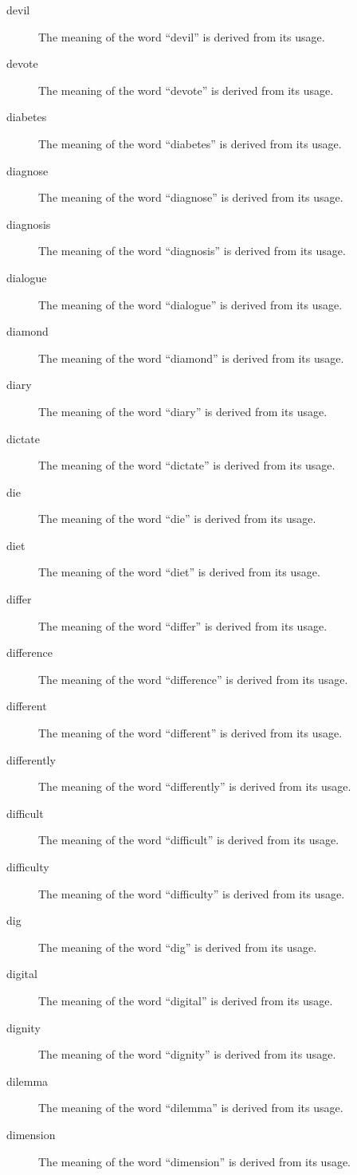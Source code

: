 \documentclass[12pt, letterpaper]{memoir}
\begin{document}
\begin{description}
\item[devil] The meaning of the word ``devil'' is derived from its usage.
\item[devote] The meaning of the word ``devote'' is derived from its usage.
\item[diabetes] The meaning of the word ``diabetes'' is derived from its usage.
\item[diagnose] The meaning of the word ``diagnose'' is derived from its usage.
\item[diagnosis] The meaning of the word ``diagnosis'' is derived from its usage.
\item[dialogue] The meaning of the word ``dialogue'' is derived from its usage.
\item[diamond] The meaning of the word ``diamond'' is derived from its usage.
\item[diary] The meaning of the word ``diary'' is derived from its usage.
\item[dictate] The meaning of the word ``dictate'' is derived from its usage.
\item[die] The meaning of the word ``die'' is derived from its usage.
\item[diet] The meaning of the word ``diet'' is derived from its usage.
\item[differ] The meaning of the word ``differ'' is derived from its usage.
\item[difference] The meaning of the word ``difference'' is derived from its usage.
\item[different] The meaning of the word ``different'' is derived from its usage.
\item[differently] The meaning of the word ``differently'' is derived from its usage.
\item[difficult] The meaning of the word ``difficult'' is derived from its usage.
\item[difficulty] The meaning of the word ``difficulty'' is derived from its usage.
\item[dig] The meaning of the word ``dig'' is derived from its usage.
\item[digital] The meaning of the word ``digital'' is derived from its usage.
\item[dignity] The meaning of the word ``dignity'' is derived from its usage.
\item[dilemma] The meaning of the word ``dilemma'' is derived from its usage.
\item[dimension] The meaning of the word ``dimension'' is derived from its usage.

\end{description}
\end{document}

